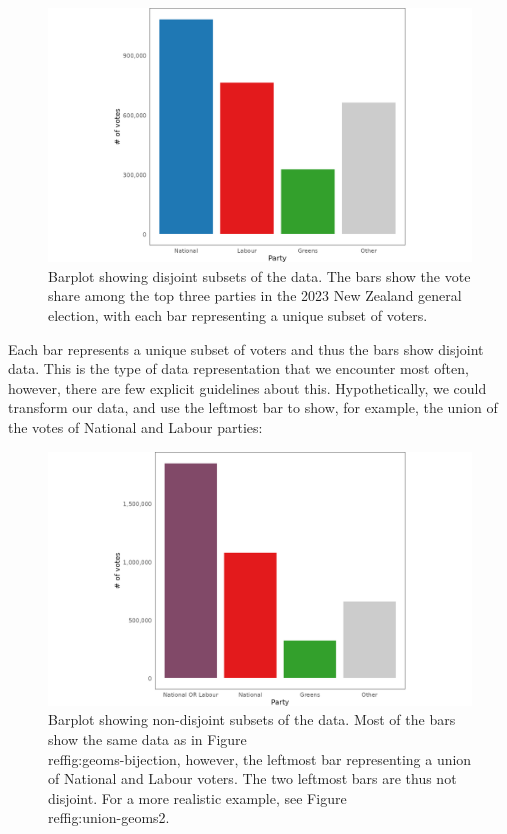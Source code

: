 \documentclass[
]{book}
\theoremstyle{definition}
\theoremstyle{definition}
\theoremstyle{definition}
\theoremstyle{definition}
\theoremstyle{remark}
\begin{document}
\begin{figure}

{\centering \includegraphics[width=1\linewidth,height=1\textheight]{./figures/barplot-bijection} 

}

\caption{Barplot showing disjoint subsets of the data. The bars show the vote share among the top three parties in the 2023 New Zealand general election, with each bar representing a unique subset of voters.}\label{fig:barplot-bijection}
\end{figure}

Each bar represents a unique subset of voters and thus the bars show disjoint data. This is the type of data representation that we encounter most often, however, there are few explicit guidelines about this. Hypothetically, we could transform our data, and use the leftmost bar to show, for example, the union of the votes of National and Labour parties:

\begin{figure}

{\centering \includegraphics[width=1\linewidth,height=1\textheight]{./figures/barplot-notbijection} 

}

\caption{Barplot showing non-disjoint subsets of the data. Most of the bars show the same data as in Figure \\ref{fig:geoms-bijection}, however, the leftmost bar representing a union of National and Labour voters. The two leftmost bars are thus not disjoint. For a more realistic example, see Figure \\ref{fig:union-geoms2}.}\label{fig:union-geoms}
\end{figure}
\end{document}
